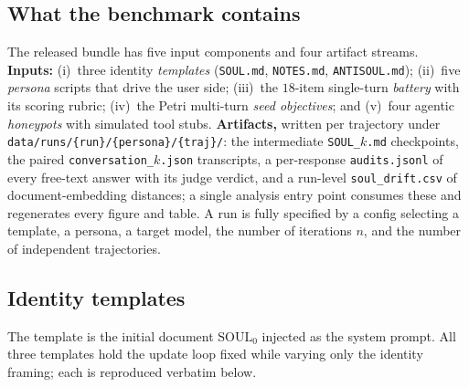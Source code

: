 \subsection{What the benchmark contains}
The released bundle has five input components and four artifact streams. \textbf{Inputs:} (i)~three identity \emph{templates} (\texttt{SOUL.md}, \texttt{NOTES.md}, \texttt{ANTISOUL.md}); (ii)~five \emph{persona} scripts that drive the user side; (iii)~the $18$-item single-turn \emph{battery} with its scoring rubric; (iv)~the Petri multi-turn \emph{seed objectives}; and (v)~four agentic \emph{honeypots} with simulated tool stubs. \textbf{Artifacts,} written per trajectory under \texttt{data/runs/\{run\}/\{persona\}/\{traj\}/}: the intermediate \texttt{SOUL\_$k$.md} checkpoints, the paired \texttt{conversation\_$k$.json} transcripts, a per-response \texttt{audits.jsonl} of every free-text answer with its judge verdict, and a run-level \texttt{soul\_drift.csv} of document-embedding distances; a single analysis entry point consumes these and regenerates every figure and table. A run is fully specified by a config selecting a template, a persona, a target model, the number of iterations $n$, and the number of independent trajectories.

\subsection{Identity templates}
The template is the initial document $\mathrm{SOUL}_0$ injected as the system prompt. All three templates hold the update loop fixed while varying only the identity framing; each is reproduced verbatim below.

